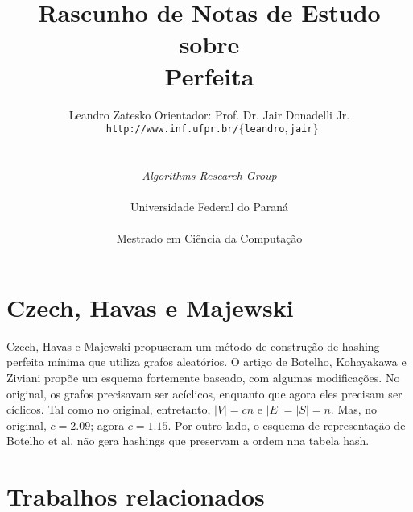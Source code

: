 \documentclass[a4paper,oneside]{article}
\title{\Large\bfseries Rascunho de Notas de Estudo sobre\\
\Huge \Hashing Perfeita}
\author{\normalsize Leandro Zatesko\hspace{0.7in}
   {\footnotesize Orientador:} Prof. Dr. Jair Donadelli Jr.\\
   \texttt{\normalsize
     http://www.inf.ufpr.br/$\{$leandro$,$jair$\}$}%
   \\[0.1in]
   \protect\parbox[t]{2.2in}{%
     \noindent\centering%
     \epsfig{file=arg.eps,height=0.5in}\\%
     \normalsize\itshape Algorithms Research Group%
   }\hspace{0.7in}
   \protect\parbox[t]{2.2in}{%
     \noindent\centering%
     \epsfig{file=ufpr.eps,height=0.5in}\\%
     \normalsize Universidade Federal do Paraná%
   }\\[0.1in]
  \normalsize Mestrado em Ciência da Computação
}
\date{}
\theoremstyle{defnotnom}
\theoremstyle{teoaxicorlem}
\begin{document}
\maketitle

\tableofcontents

\section{Czech, Havas e Majewski}

Czech, Havas e Majewski propuseram um método de construção de hashing perfeita mínima que utiliza grafos aleatórios. O artigo de Botelho, Kohayakawa e Ziviani propõe um esquema fortemente baseado, com algumas modificações. No original, os grafos precisavam ser acíclicos, enquanto que agora eles precisam ser cíclicos. Tal como no original, entretanto, $|V|=cn$ e $|E|=|S|=n$. Mas, no original, $c=2.09$; agora $c=1.15$. Por outro lado, o esquema de representação de Botelho et al. não gera hashings que preservam a ordem nna tabela hash.

\section{Trabalhos relacionados}
\end{document}
